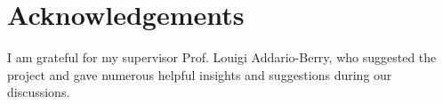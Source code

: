 
\section{\bf Acknowledgements}
I am grateful for my supervisor Prof. Louigi Addario-Berry, who suggested the project and gave numerous helpful insights and suggestions during our discussions.

\small
{} %
\printnomenclature[3.1cm]
\normalsize


\small 


\normalsize

%  
%

%

